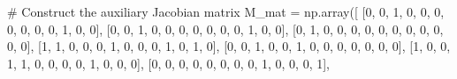 \documentclass[
  letterpaper,
  DIV=11,
  numbers=noendperiod]{scrreprt}
\newenvironment{Shaded}{\begin{snugshade}}{\end{snugshade}}
\newcommand{\CommentTok}[1]{\textcolor[rgb]{0.37,0.37,0.37}{#1}}
\newcommand{\DecValTok}[1]{\textcolor[rgb]{0.68,0.00,0.00}{#1}}
\newcommand{\NormalTok}[1]{\textcolor[rgb]{0.00,0.23,0.31}{#1}}
\newcommand{\OperatorTok}[1]{\textcolor[rgb]{0.37,0.37,0.37}{#1}}
\begin{document}
\begin{tcolorbox}
\begin{Shaded}
\begin{Highlighting}[]
\CommentTok{\# Construct the auxiliary Jacobian matrix}
\NormalTok{M\_mat }\OperatorTok{=}\NormalTok{ np.array([}
\NormalTok{    [}\DecValTok{0}\NormalTok{, }\DecValTok{0}\NormalTok{, }\DecValTok{1}\NormalTok{, }\DecValTok{0}\NormalTok{, }\DecValTok{0}\NormalTok{, }\DecValTok{0}\NormalTok{, }\DecValTok{0}\NormalTok{, }\DecValTok{0}\NormalTok{, }\DecValTok{0}\NormalTok{, }\DecValTok{0}\NormalTok{, }\DecValTok{1}\NormalTok{, }\DecValTok{0}\NormalTok{, }\DecValTok{0}\NormalTok{],}
\NormalTok{    [}\DecValTok{0}\NormalTok{, }\DecValTok{0}\NormalTok{, }\DecValTok{1}\NormalTok{, }\DecValTok{0}\NormalTok{, }\DecValTok{0}\NormalTok{, }\DecValTok{0}\NormalTok{, }\DecValTok{0}\NormalTok{, }\DecValTok{0}\NormalTok{, }\DecValTok{0}\NormalTok{, }\DecValTok{0}\NormalTok{, }\DecValTok{1}\NormalTok{, }\DecValTok{0}\NormalTok{, }\DecValTok{0}\NormalTok{],}
\NormalTok{    [}\DecValTok{0}\NormalTok{, }\DecValTok{1}\NormalTok{, }\DecValTok{0}\NormalTok{, }\DecValTok{0}\NormalTok{, }\DecValTok{0}\NormalTok{, }\DecValTok{0}\NormalTok{, }\DecValTok{0}\NormalTok{, }\DecValTok{0}\NormalTok{, }\DecValTok{0}\NormalTok{, }\DecValTok{0}\NormalTok{, }\DecValTok{0}\NormalTok{, }\DecValTok{0}\NormalTok{, }\DecValTok{0}\NormalTok{],}
\NormalTok{    [}\DecValTok{1}\NormalTok{, }\DecValTok{1}\NormalTok{, }\DecValTok{0}\NormalTok{, }\DecValTok{0}\NormalTok{, }\DecValTok{0}\NormalTok{, }\DecValTok{1}\NormalTok{, }\DecValTok{0}\NormalTok{, }\DecValTok{0}\NormalTok{, }\DecValTok{0}\NormalTok{, }\DecValTok{1}\NormalTok{, }\DecValTok{0}\NormalTok{, }\DecValTok{1}\NormalTok{, }\DecValTok{0}\NormalTok{],}
\NormalTok{    [}\DecValTok{0}\NormalTok{, }\DecValTok{0}\NormalTok{, }\DecValTok{1}\NormalTok{, }\DecValTok{0}\NormalTok{, }\DecValTok{0}\NormalTok{, }\DecValTok{1}\NormalTok{, }\DecValTok{0}\NormalTok{, }\DecValTok{0}\NormalTok{, }\DecValTok{0}\NormalTok{, }\DecValTok{0}\NormalTok{, }\DecValTok{0}\NormalTok{, }\DecValTok{0}\NormalTok{, }\DecValTok{0}\NormalTok{],}
\NormalTok{    [}\DecValTok{1}\NormalTok{, }\DecValTok{0}\NormalTok{, }\DecValTok{0}\NormalTok{, }\DecValTok{1}\NormalTok{, }\DecValTok{1}\NormalTok{, }\DecValTok{0}\NormalTok{, }\DecValTok{0}\NormalTok{, }\DecValTok{0}\NormalTok{, }\DecValTok{0}\NormalTok{, }\DecValTok{1}\NormalTok{, }\DecValTok{0}\NormalTok{, }\DecValTok{0}\NormalTok{, }\DecValTok{0}\NormalTok{],}
\NormalTok{    [}\DecValTok{0}\NormalTok{, }\DecValTok{0}\NormalTok{, }\DecValTok{0}\NormalTok{, }\DecValTok{0}\NormalTok{, }\DecValTok{0}\NormalTok{, }\DecValTok{0}\NormalTok{, }\DecValTok{0}\NormalTok{, }\DecValTok{0}\NormalTok{, }\DecValTok{1}\NormalTok{, }\DecValTok{0}\NormalTok{, }\DecValTok{0}\NormalTok{, }\DecValTok{0}\NormalTok{, }\DecValTok{1}\NormalTok{],}

\end{Highlighting}
\end{Shaded}
\end{tcolorbox}
\end{document}

